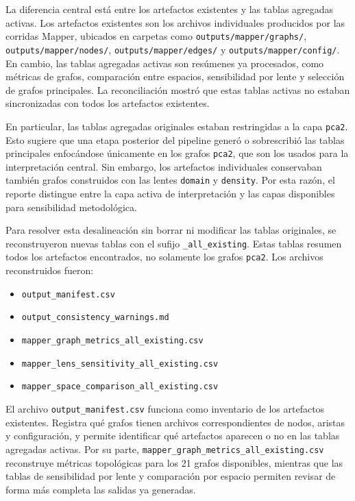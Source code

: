 La diferencia central está entre los artefactos existentes y las tablas agregadas activas. Los artefactos existentes son los archivos individuales producidos por las corridas Mapper, ubicados en carpetas como \texttt{outputs/mapper/graphs/}, \texttt{outputs/mapper/nodes/}, \texttt{outputs/mapper/edges/} y \texttt{outputs/mapper/config/}. En cambio, las tablas agregadas activas son resúmenes ya procesados, como métricas de grafos, comparación entre espacios, sensibilidad por lente y selección de grafos principales. La reconciliación mostró que estas tablas activas no estaban sincronizadas con todos los artefactos existentes.

En particular, las tablas agregadas originales estaban restringidas a la capa \texttt{pca2}. Esto sugiere que una etapa posterior del pipeline generó o sobrescribió las tablas principales enfocándose únicamente en los grafos \texttt{pca2}, que son los usados para la interpretación central. Sin embargo, los artefactos individuales conservaban también grafos construidos con las lentes \texttt{domain} y \texttt{density}. Por esta razón, el reporte distingue entre la capa activa de interpretación y las capas disponibles para sensibilidad metodológica.

Para resolver esta desalineación sin borrar ni modificar las tablas originales, se reconstruyeron nuevas tablas con el sufijo \texttt{\_all\_existing}. Estas tablas resumen todos los artefactos encontrados, no solamente los grafos \texttt{pca2}. Los archivos reconstruidos fueron:

\begin{itemize}
    \item \texttt{output\_manifest.csv}
    \item \texttt{output\_consistency\_warnings.md}
    \item \texttt{mapper\_graph\_metrics\_all\_existing.csv}
    \item \texttt{mapper\_lens\_sensitivity\_all\_existing.csv}
    \item \texttt{mapper\_space\_comparison\_all\_existing.csv}
\end{itemize}

El archivo \texttt{output\_manifest.csv} funciona como inventario de los artefactos existentes. Registra qué grafos tienen archivos correspondientes de nodos, aristas y configuración, y permite identificar qué artefactos aparecen o no en las tablas agregadas activas. Por su parte, \texttt{mapper\_graph\_metrics\_all\_existing.csv} reconstruye métricas topológicas para los 21 grafos disponibles, mientras que las tablas de sensibilidad por lente y comparación por espacio permiten revisar de forma más completa las salidas ya generadas.

